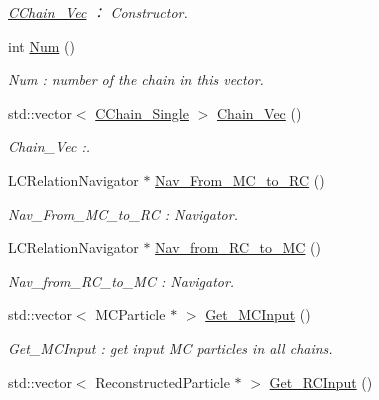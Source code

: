 \begin{DoxyCompactItemize}
\begin{DoxyCompactList}\small\item\em \hyperlink{classToolSet_1_1CChain__Vec}{CChain\_\-Vec} ： Constructor. \item\end{DoxyCompactList}\item 
int \hyperlink{classToolSet_1_1CChain__Vec_ad1ba5109d2db818706de4e96f485f72c}{Num} ()
\begin{DoxyCompactList}\small\item\em Num : number of the chain in this vector. \item\end{DoxyCompactList}\item 
std::vector$<$ \hyperlink{classToolSet_1_1CChain__Single}{CChain\_\-Single} $>$ \hyperlink{classToolSet_1_1CChain__Vec_ace17e3ec32dca382602d0ccc9f2d377e}{Chain\_\-Vec} ()
\begin{DoxyCompactList}\small\item\em Chain\_\-Vec :. \item\end{DoxyCompactList}\item 
LCRelationNavigator $\ast$ \hyperlink{classToolSet_1_1CChain__Vec_aee6526eb88b188ad12a664b1cf50df45}{Nav\_\-From\_\-MC\_\-to\_\-RC} ()
\begin{DoxyCompactList}\small\item\em Nav\_\-From\_\-MC\_\-to\_\-RC : Navigator. \item\end{DoxyCompactList}\item 
LCRelationNavigator $\ast$ \hyperlink{classToolSet_1_1CChain__Vec_a37f706763eba430e02efe9ce3965ed8c}{Nav\_\-from\_\-RC\_\-to\_\-MC} ()
\begin{DoxyCompactList}\small\item\em Nav\_\-from\_\-RC\_\-to\_\-MC : Navigator. \item\end{DoxyCompactList}\item 
std::vector$<$ MCParticle $\ast$ $>$ \hyperlink{classToolSet_1_1CChain__Vec_aa9f1bcca5d3f17ae1319e96eb9fdd7c1}{Get\_\-MCInput} ()
\begin{DoxyCompactList}\small\item\em Get\_\-MCInput : get input MC particles in all chains. \item\end{DoxyCompactList}\item 
std::vector$<$ ReconstructedParticle $\ast$ $>$ \hyperlink{classToolSet_1_1CChain__Vec_aba6a8082d60fbc646abebfd98665c8f0}{Get\_\-RCInput} ()

\end{DoxyCompactItemize}
